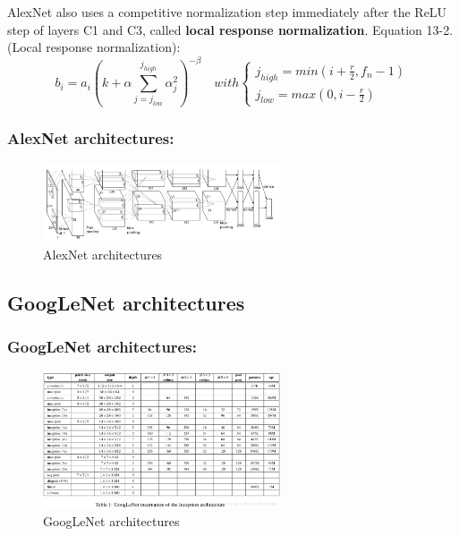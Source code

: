 \documentclass{beamer}
\begin{document}
    \begin{frame}
    AlexNet also uses a competitive normalization step immediately after the ReLU step of layers C1 and C3, called \textbf{local response normalization}.
        Equation 13-2.(Local response normalization):
        \begin{equation}
             b_i=a_i\left(k+\alpha\sum_{j=j_{low}}^{j_{high}}\alpha_j^2\right)^{-\beta}\quad with
             \left\{\begin{array}{lr}
                 j_{high}=min\left(i+\frac{r}{2},f_n-1\right)\\
                 j_{low}=max\left(0,i-\frac{r}{2}\right)
             \end{array}
            \right.
        \end{equation}
    \end{frame}

    \begin{frame}
    \frametitle{AlexNet architectures: }
        \begin{figure}[H]
            \begin{center}
                \includegraphics[width=7cm]{FIGURE13-2.png}
            \end{center}
        \caption{AlexNet architectures}
        \end{figure}
    \end{frame}
\subsection{GoogLeNet architectures}
    \begin{frame}
    \frametitle{GoogLeNet architectures: }
         \begin{figure}[H]
            \begin{center}
                \includegraphics[width=7cm]{table13-3}
            \end{center}
        \caption{GoogLeNet architectures}
        \end{figure}
    \end{frame}
\end{document}

